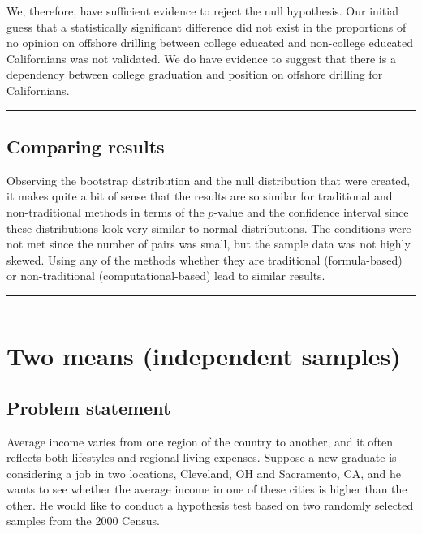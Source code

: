 \documentclass[12pt,]{krantz}
\begin{document}
We, therefore, have sufficient evidence to reject the null hypothesis.
Our initial guess that a statistically significant difference did not
exist in the proportions of no opinion on offshore drilling between
college educated and non-college educated Californians was not
validated. We do have evidence to suggest that there is a dependency
between college graduation and position on offshore drilling for
Californians.

\begin{center}\rule{0.5\linewidth}{\linethickness}\end{center}

\subsection{Comparing results}\label{comparing-results-2}

Observing the bootstrap distribution and the null distribution that were
created, it makes quite a bit of sense that the results are so similar
for traditional and non-traditional methods in terms of the \(p\)-value
and the confidence interval since these distributions look very similar
to normal distributions. The conditions were not met since the number of
pairs was small, but the sample data was not highly skewed. Using any of
the methods whether they are traditional (formula-based) or
non-traditional (computational-based) lead to similar results.

\begin{center}\rule{0.5\linewidth}{\linethickness}\end{center}

\begin{center}\rule{0.5\linewidth}{\linethickness}\end{center}

\section{Two means (independent
samples)}\label{two-means-independent-samples}

\subsection{Problem statement}\label{problem-statement-3}

Average income varies from one region of the country to another, and it
often reflects both lifestyles and regional living expenses. Suppose a
new graduate is considering a job in two locations, Cleveland, OH and
Sacramento, CA, and he wants to see whether the average income in one of
these cities is higher than the other. He would like to conduct a
hypothesis test based on two randomly selected samples from the 2000
Census. \citep[Tweaked a bit from][ {[}Chapter 5{]}]{isrs2014}
\end{document}
